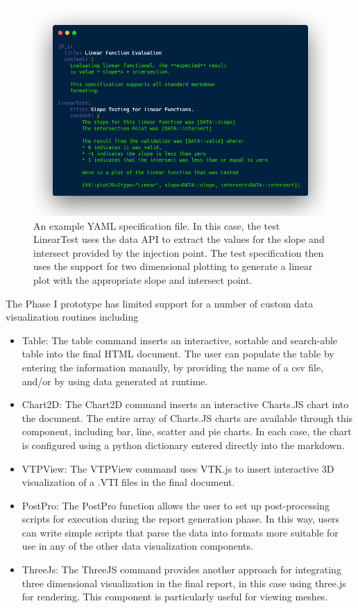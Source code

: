 \begin{figure}
 \includegraphics[width=\textwidth]{./Figures/yaml-md.png}
\caption{ An example YAML specification file. In this case, the test LinearTest uses the data API to extract the values for the slope and intersect provided by the injection 
point. The test specification then uses the support for two dimensional plotting to generate a linear plot with the appropriate slope and intersect point. \label{fig:test-spec}}
 \end{figure}

The Phase I prototype has limited support for a number of custom data visualization routines including 
\begin{itemize}
\item Table: The table command inserts an interactive, sortable and search-able table into the final HTML document. The user can populate the table by entering the information
manaully, by providing the name of a csv file, and/or by using data generated at runtime. 
\item Chart2D: The Chart2D command inserts an interactive Charts.JS chart into the document. The entire array of Charts.JS charts are available through this component, including bar, 
line, scatter and pie charts. In each case, the chart is configured using a python dictionary entered directly into the markdown. 
\item VTPView: The VTPView command uses VTK.js to insert interactive 3D visualization of a .VTI files in the final document. 
\item PostPro: The PostPro function allows the user to set up post-processing scripts for execution during the report generation phase. In this way,
users can write simple scripts that parse the data into formats more suitable for use in any of the other data visualization components. 
\item ThreeJs: The ThreeJS command provides another approach for integrating three dimensional visualization in the final report, in this case using three.js for rendering. This 
component is particularly useful for viewing meshes. 
\end{itemize}

